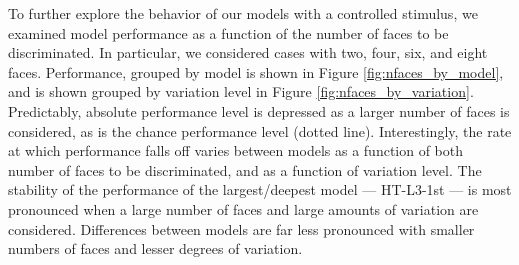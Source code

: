 To further explore the behavior of our models with a controlled stimulus, we examined model
performance as a function of the number of faces to be discriminated.  In particular, we
considered cases with two, four, six, and eight faces.  Performance, grouped by model is shown
in Figure \ref{fig:nfaces_by_model}, and is shown grouped by variation level in
Figure \ref{fig:nfaces_by_variation}.  Predictably, absolute performance level is depressed as a larger
number of faces is considered, as is the chance performance level (dotted line). Interestingly, the
rate at which performance falls off varies between models as a function of both number of faces
to be discriminated, and as a function of variation level.  The stability of the performance of the
largest/deepest model --- HT-L3-1st --- is most pronounced when a large number of faces and large amounts of variation
are considered.  Differences between models are far less pronounced with smaller numbers of
faces and lesser degrees of variation.


